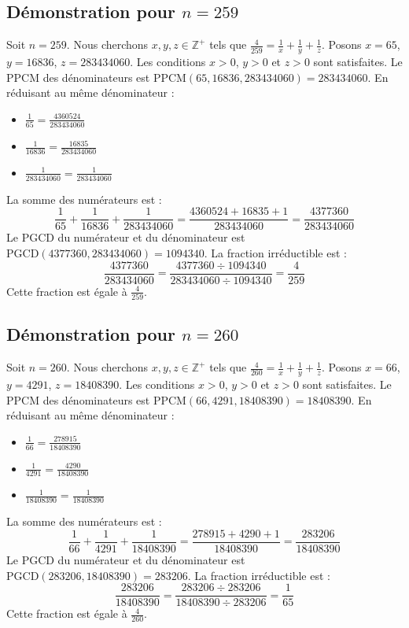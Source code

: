 \documentclass[11pt,a4paper]{article}
\begin{document}
\subsection{Démonstration pour $n = 259$}
Soit $n = 259$. Nous cherchons $x, y, z \in \mathbb{Z}^{+}$ tels que $\frac{4}{259} = \frac{1}{x} + \frac{1}{y} + \frac{1}{z}$.
Posons $x = 65$, $y = 16836$, $z = 283434060$.
Les conditions $x > 0$, $y > 0$ et $z > 0$ sont satisfaites.
Le PPCM des dénominateurs est $\text{PPCM}(65, 16836, 283434060) = 283434060$.
En réduisant au même dénominateur :
\begin{itemize}
    \item $\frac{1}{65} = \frac{4360524}{283434060}$
    \item $\frac{1}{16836} = \frac{16835}{283434060}$
    \item $\frac{1}{283434060} = \frac{1}{283434060}$
\end{itemize}
La somme des numérateurs est :
$$ \frac{1}{65} + \frac{1}{16836} + \frac{1}{283434060} = \frac{4360524 + 16835 + 1}{283434060} = \frac{4377360}{283434060} $$
Le PGCD du numérateur et du dénominateur est $\text{PGCD}(4377360, 283434060) = 1094340$.
La fraction irréductible est :
$$ \frac{4377360}{283434060} = \frac{4377360 \div 1094340}{283434060 \div 1094340} = \frac{4}{259} $$
Cette fraction est égale à $\frac{4}{259}$.

\subsection{Démonstration pour $n = 260$}
Soit $n = 260$. Nous cherchons $x, y, z \in \mathbb{Z}^{+}$ tels que $\frac{4}{260} = \frac{1}{x} + \frac{1}{y} + \frac{1}{z}$.
Posons $x = 66$, $y = 4291$, $z = 18408390$.
Les conditions $x > 0$, $y > 0$ et $z > 0$ sont satisfaites.
Le PPCM des dénominateurs est $\text{PPCM}(66, 4291, 18408390) = 18408390$.
En réduisant au même dénominateur :
\begin{itemize}
    \item $\frac{1}{66} = \frac{278915}{18408390}$
    \item $\frac{1}{4291} = \frac{4290}{18408390}$
    \item $\frac{1}{18408390} = \frac{1}{18408390}$
\end{itemize}
La somme des numérateurs est :
$$ \frac{1}{66} + \frac{1}{4291} + \frac{1}{18408390} = \frac{278915 + 4290 + 1}{18408390} = \frac{283206}{18408390} $$
Le PGCD du numérateur et du dénominateur est $\text{PGCD}(283206, 18408390) = 283206$.
La fraction irréductible est :
$$ \frac{283206}{18408390} = \frac{283206 \div 283206}{18408390 \div 283206} = \frac{1}{65} $$
Cette fraction est égale à $\frac{4}{260}$.
\end{document}
